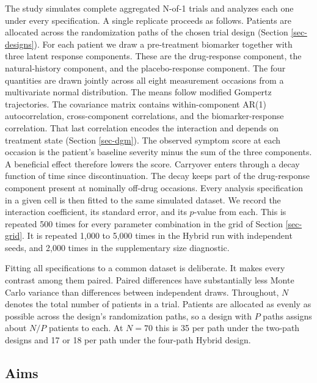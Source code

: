 \documentclass[
  11pt,
]{article}
\begin{document}
The study simulates complete aggregated N-of-1 trials and analyzes
each one under every specification. A single replicate proceeds as
follows. Patients are allocated across the randomization paths of
the chosen trial design (Section \ref{sec-designs}). For each
patient we draw a pre-treatment biomarker together with three latent
response components. These are the drug-response component, the
natural-history component, and the placebo-response component. The
four quantities are drawn jointly across all eight measurement
occasions from a multivariate normal distribution. The means follow
modified Gompertz trajectories. The covariance matrix contains
within-component AR(1) autocorrelation, cross-component
correlations, and the biomarker-response correlation. That last
correlation encodes the interaction and depends on treatment state
(Section \ref{sec-dgm}). The observed symptom score at each occasion
is the patient's baseline severity minus the sum of the three
components. A beneficial effect
therefore lowers the score. Carryover enters through a decay
function of time since discontinuation. The decay keeps part of the
drug-response component present at nominally off-drug occasions.
Every analysis specification in a given cell is then fitted to the
same simulated dataset. We record the interaction coefficient, its
standard error, and its \(p\)-value from each. This is repeated 500
times for every parameter combination in the grid of Section
\ref{sec-grid}. It is repeated 1,000 to 5,000 times in the Hybrid
run with independent seeds, and 2,000 times in the supplementary size
diagnostic.

Fitting all specifications to a common dataset is deliberate. It
makes every contrast among them paired. Paired differences have
substantially less Monte Carlo variance than differences between
independent draws. Throughout, \(N\) denotes the total number of
patients in a trial. Patients are allocated as evenly as possible
across the design's randomization paths, so a design with \(P\) paths
assigns about \(N/P\) patients to each. At \(N = 70\) this is 35 per
path under the two-path designs and 17 or 18 per path under the
four-path Hybrid design.

\subsection{Aims}\label{sec-aims}
\end{document}
